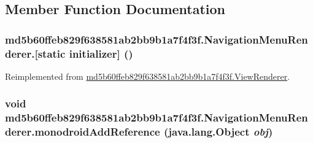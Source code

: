\subsection{Member Function Documentation}
\hypertarget{classmd5b60ffeb829f638581ab2bb9b1a7f4f3f_1_1_navigation_menu_renderer_98a35b1cf5c157fc7aacf89402e6bed1}{
\subsubsection[{[static initializer]}]{\setlength{\rightskip}{0pt plus 5cm}md5b60ffeb829f638581ab2bb9b1a7f4f3f.NavigationMenuRenderer.\mbox{[}static initializer\mbox{]} ()}}
\label{classmd5b60ffeb829f638581ab2bb9b1a7f4f3f_1_1_navigation_menu_renderer_98a35b1cf5c157fc7aacf89402e6bed1}




Reimplemented from \hyperlink{classmd5b60ffeb829f638581ab2bb9b1a7f4f3f_1_1_view_renderer_ec3c17e00fab196999735579e51f409f}{md5b60ffeb829f638581ab2bb9b1a7f4f3f.ViewRenderer}.\hypertarget{classmd5b60ffeb829f638581ab2bb9b1a7f4f3f_1_1_navigation_menu_renderer_28a29aa89bcd264a300fc518ddef9f73}{
\subsubsection[{monodroidAddReference}]{\setlength{\rightskip}{0pt plus 5cm}void md5b60ffeb829f638581ab2bb9b1a7f4f3f.NavigationMenuRenderer.monodroidAddReference (java.lang.Object {\em obj})}}
\label{classmd5b60ffeb829f638581ab2bb9b1a7f4f3f_1_1_navigation_menu_renderer_28a29aa89bcd264a300fc518ddef9f73}




